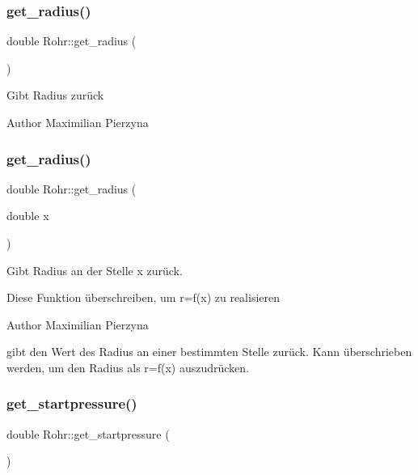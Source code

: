 \subsubsection{\texorpdfstring{get\+\_\+radius()}{get\_radius()}\hspace{0.1cm}{\footnotesize\ttfamily [1/2]}}
{\footnotesize\ttfamily double Rohr\+::get\+\_\+radius (\begin{DoxyParamCaption}{ }\end{DoxyParamCaption})}

Gibt Radius zurück \begin{DoxyAuthor}{Author}
Maximilian Pierzyna 
\end{DoxyAuthor}
\mbox{\label{class_rohr_a427e4ad6d350912715bd6796e385eaf3}} 
\subsubsection{\texorpdfstring{get\+\_\+radius()}{get\_radius()}\hspace{0.1cm}{\footnotesize\ttfamily [2/2]}}
{\footnotesize\ttfamily double Rohr\+::get\+\_\+radius (\begin{DoxyParamCaption}\item[{double}]{x }\end{DoxyParamCaption})}



Gibt Radius an der Stelle x zurück. 

Diese Funktion überschreiben, um r=f(x) zu realisieren

\begin{DoxyAuthor}{Author}
Maximilian Pierzyna 
\end{DoxyAuthor}
gibt den Wert des Radius an einer bestimmten Stelle zurück. Kann überschrieben werden, um den Radius als r=f(x) auszudrücken.\mbox{\label{class_rohr_ad93033ce4a63458e188cfc9d8771836e}} 
\subsubsection{\texorpdfstring{get\+\_\+startpressure()}{get\_startpressure()}}
{\footnotesize\ttfamily double Rohr\+::get\+\_\+startpressure (\begin{DoxyParamCaption}{ }\end{DoxyParamCaption})}

